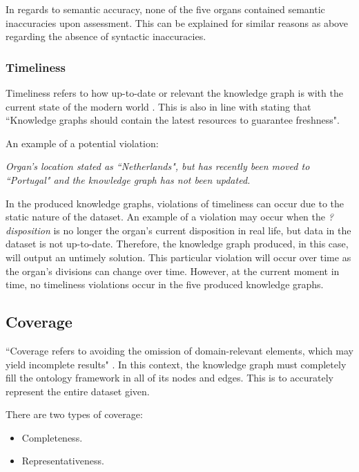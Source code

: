In regards to semantic accuracy, none of the five organs contained semantic inaccuracies upon assessment. This can be explained for similar reasons as above regarding the absence of syntactic inaccuracies. 

\subsubsection{Timeliness}
\hspace{0.5cm} Timeliness refers to how up-to-date or relevant the knowledge graph is with the current state of the modern world \cite{knowledgegraphevaulationbook}. This is also in line with \cite{evaluationpaper} stating that ``Knowledge graphs should contain the latest resources to guarantee freshness".

\noindent An example of a potential violation:
\begin{displayquote}
    \textit{Organ's location stated as ``Netherlands", but has recently been moved to ``Portugal" and the knowledge graph has not been updated.}
\end{displayquote}

In the produced knowledge graphs, violations of timeliness can occur due to the static nature of the dataset. An example of a violation may occur when the \textit{?disposition} is no longer the organ's current disposition in real life, but data in the dataset is not up-to-date. Therefore, the knowledge graph produced, in this case, will output an untimely solution. This particular violation will occur over time as the organ's divisions can change over time. However, at the current moment in time, no timeliness violations occur in the five produced knowledge graphs.

\subsection{Coverage}
\hspace{0.5cm} ``Coverage refers to avoiding the omission of domain-relevant elements, which may yield incomplete results" \cite{knowledgegraphevaulationbook}. In this context, the knowledge graph must completely fill the ontology framework in all of its nodes and edges. This is to accurately represent the entire dataset given. 

\noindent There are two types of coverage: 

\vspace{-0.15cm}
\begin{itemize}
\itemsep0em 
\item Completeness.
\vspace{-0.1cm}
\item Representativeness.
\end{itemize}
\vspace{-0.4cm}

